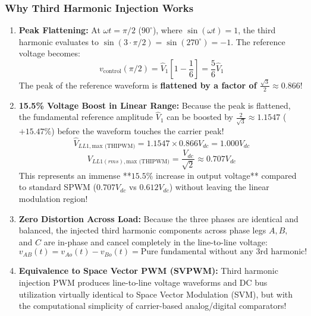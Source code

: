 \documentclass[11pt,a4paper]{article}
\begin{document}
\subsubsection{Why Third Harmonic Injection Works}
\begin{conceptbox}
\begin{enumerate}
  \item \textbf{Peak Flattening:} At $\omega t = \pi/2$ ($90^\circ$), where $\sin(\omega t) = 1$, the third harmonic evaluates to $\sin(3 \cdot \pi/2) = \sin(270^\circ) = -1$. The reference voltage becomes:
  \begin{equation}
  v_{\text{control}}(\pi/2) = \hat{V}_1 \left[ 1 - \frac{1}{6} \right] = \frac{5}{6} \hat{V}_1
  \end{equation}
  The peak of the reference waveform is \textbf{flattened by a factor of $\frac{\sqrt{3}}{2} \approx 0.866$}!
  \item \textbf{15.5\% Voltage Boost in Linear Range:} Because the peak is flattened, the fundamental reference amplitude $\hat{V}_1$ can be boosted by $\frac{2}{\sqrt{3}} \approx 1.1547$ ($+15.47\%$) before the waveform touches the carrier peak!
  \begin{equation}
  \hat{V}_{LL1,\text{max (THIPWM)}} = 1.1547 \times 0.866 V_{dc} = 1.000 V_{dc}
  \end{equation}
  \begin{equation}
  V_{LL1(rms),\text{max (THIPWM)}} = \frac{V_{dc}}{\sqrt{2}} \approx 0.707 V_{dc}
  \end{equation}
  This represents an immense **$15.5\%$ increase in output voltage** compared to standard SPWM ($0.707 V_{dc}$ vs $0.612 V_{dc}$) without leaving the linear modulation region!
  \item \textbf{Zero Distortion Across Load:} Because the three phases are identical and balanced, the injected third harmonic components across phase legs $A, B,$ and $C$ are in-phase and cancel completely in the line-to-line voltage:
  \begin{equation}
  v_{AB}(t) = v_{Ao}(t) - v_{Bo}(t) = \text{Pure fundamental without any 3rd harmonic!}
  \end{equation}
  \item \textbf{Equivalence to Space Vector PWM (SVPWM):} Third harmonic injection PWM produces line-to-line voltage waveforms and DC bus utilization virtually identical to Space Vector Modulation (SVM), but with the computational simplicity of carrier-based analog/digital comparators!
\end{enumerate}
\end{conceptbox}
\end{document}
